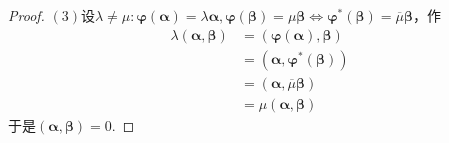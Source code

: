 {\begin{proof}
        $(3)$设$\lambda\neq\mu:\bm{\varphi}\left(\bm{\alpha}\right)=\lambda\bm{\alpha},\bm{\varphi}\left(\bm{\beta}\right)=\mu\bm{\beta}\Longleftrightarrow\bm{\varphi}^*\left(\bm{\beta}\right)=\overline{\mu}\bm{\beta}$，作\begin{align*}
            \lambda\left(
            \bm{\alpha},\bm{\beta}
            \right) & =\left(
            \bm{\varphi}\left(\bm{\alpha}\right),\bm{\beta}
            \right)              \\
                    & =\left(
            \bm{\alpha},\bm{\varphi}^*\left(\bm{\beta}\right)
            \right)              \\
                    & =\left(
            \bm{\alpha},\overline{\mu}\bm{\beta}
            \right)              \\
                    & =\mu\left(
            \bm{\alpha},\bm{\beta}
            \right)
        \end{align*}于是$\left(
            \bm{\alpha},\bm{\beta}
            \right)=0.$
    \end{proof}
}
